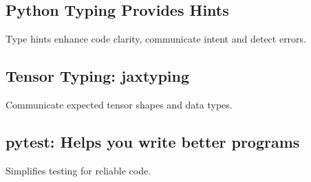 \subsection{Python Typing Provides Hints}
\begin{notes}
    Type hints enhance code clarity, communicate intent and detect errors.
\end{notes}

\subsection{Tensor Typing: jaxtyping}
\begin{notes}
    Communicate expected tensor shapes and data types. 
\end{notes}

\subsection{pytest: Helps you write better programs}
\begin{notes}
    Simplifies testing for reliable code.
\end{notes}


